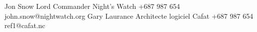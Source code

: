 
\horizontalLine
\begin{referees}
		{Jon Snow}
		{Lord Commander}
		{Night's Watch}
		{+687 987 654}
		{john.snow@nightwatch.org}
	\hspace*{1.5cm}
		{Gary Laurance}
		{Architecte logiciel}
		{Cafat}
		{+687 987 654}
		{ref1@cafat.nc}
\end{referees}

